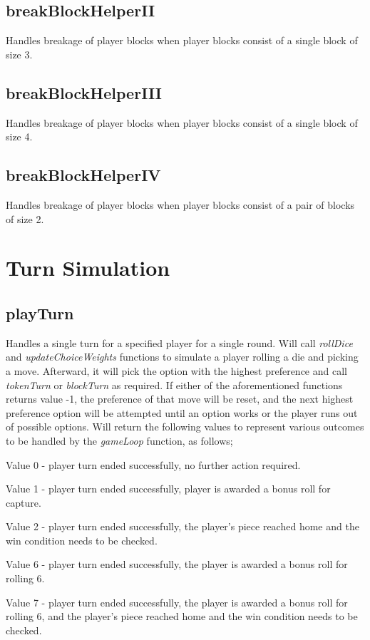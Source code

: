 \documentclass{article}
\begin{document}
\subsection{breakBlockHelperII}
Handles breakage of player blocks when player blocks consist of a single block of size 3.

\subsection{breakBlockHelperIII}
Handles breakage of player blocks when player blocks consist of a single block of size 4.

\subsection{breakBlockHelperIV}
Handles breakage of player blocks when player blocks consist of a pair of blocks of size 2.

\section{Turn Simulation}
\subsection{playTurn}
Handles a single turn for a specified player for a single round. Will call \textit{rollDice} and \textit{updateChoiceWeights} functions to simulate a player rolling a die and picking a move. Afterward, it will pick the option with the highest preference and call \textit{tokenTurn} or \textit{blockTurn} as required. If either of the aforementioned functions returns value -1, the preference of that move will be reset, and the next highest preference option will be attempted until an option works or the player runs out of possible options. Will return the following values to represent various outcomes to be handled by the \textit{gameLoop} function, as follows;

Value 0 - player turn ended successfully, no further action required.

Value 1 - player turn ended successfully, player is awarded a bonus roll for capture.

Value 2 - player turn ended successfully, the player's piece reached home and the win condition needs to be checked.

Value 6 - player turn ended successfully, the player is awarded a bonus roll for rolling 6.

Value 7 - player turn ended successfully, the player is awarded a bonus roll for rolling 6, and the player's piece reached home and the win condition needs to be checked.
\end{document}
